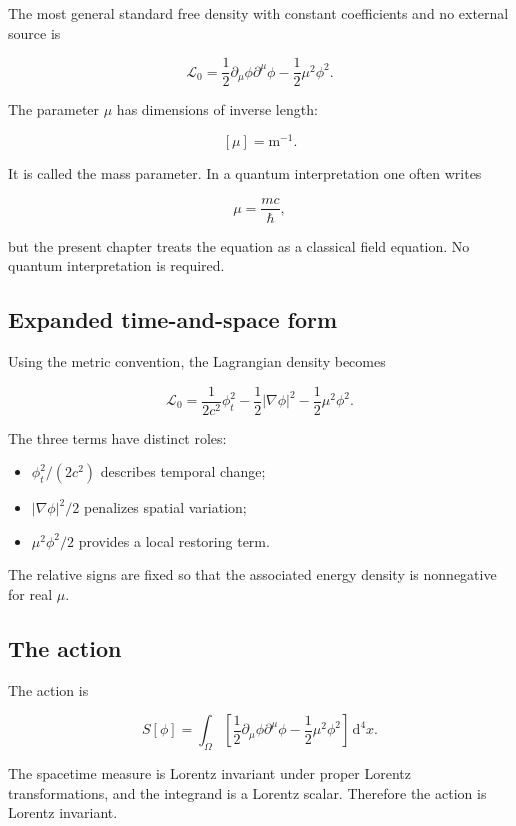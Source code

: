 The most general standard free density with constant coefficients and no external source is

\[
\boxed{
\mathcal{L}_{0}
=
\frac{1}{2}
\partial_{\mu}\phi\partial^{\mu}\phi
-
\frac{1}{2}\mu^{2}\phi^{2}
}.
\]

The parameter \(\mu\) has dimensions of inverse length:

\[
[\mu]=\mathrm{m}^{-1}.
\]

It is called the mass parameter. In a quantum interpretation one often writes

\[
\mu=\frac{mc}{\hbar},
\]

but the present chapter treats the equation as a classical field equation. No quantum interpretation is required.

\subsection{Expanded time-and-space form}

Using the metric convention, the Lagrangian density becomes

\[
\boxed{
\mathcal{L}_{0}
=
\frac{1}{2c^{2}}\phi_{t}^{2}
-
\frac{1}{2}|\nabla\phi|^{2}
-
\frac{1}{2}\mu^{2}\phi^{2}
}.
\]

The three terms have distinct roles:

\begin{itemize}
    \item \(\phi_{t}^{2}/(2c^{2})\) describes temporal change;
    \item \(|\nabla\phi|^{2}/2\) penalizes spatial variation;
    \item \(\mu^{2}\phi^{2}/2\) provides a local restoring term.
\end{itemize}

The relative signs are fixed so that the associated energy density is nonnegative for real \(\mu\).

\subsection{The action}

The action is

\[
\boxed{
S[\phi]
=
\int_{\Omega}
\left[
\frac{1}{2}
\partial_{\mu}\phi\partial^{\mu}\phi
-
\frac{1}{2}\mu^{2}\phi^{2}
\right]
\,\mathrm{d}^{4}x
}.
\]

The spacetime measure is Lorentz invariant under proper Lorentz transformations, and the integrand is a Lorentz scalar. Therefore the action is Lorentz invariant.

